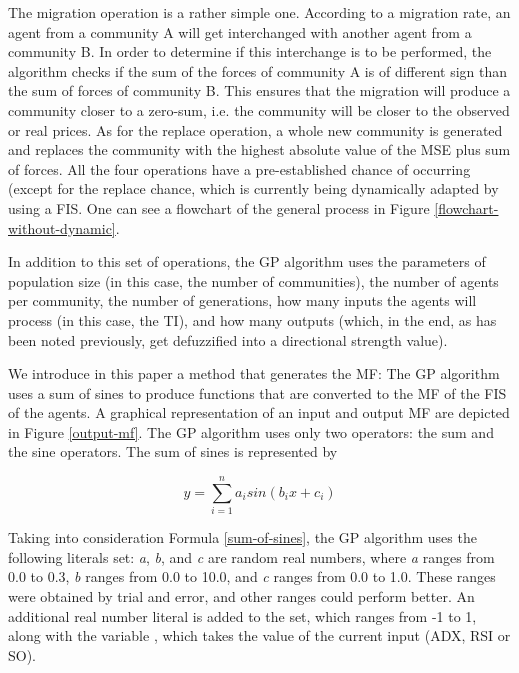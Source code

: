 \documentclass[a4paper,twoside]{article}
\begin{document}
The migration operation is a rather simple one. According to a
migration rate, an agent from a community A will get interchanged
with another agent from a community B. In order to determine if this
interchange is to be performed, the algorithm checks if the sum of the
forces of community A is of different sign than the sum of forces of
community B. This ensures that the migration will produce a community
closer to a zero-sum, i.e. the community will be closer to the
observed or real prices. As for the replace operation, a whole new
community is generated and replaces the community with the highest
absolute value of the MSE plus sum of forces. All the four operations
have a pre-established chance of occurring (except for the replace
chance, which is currently being dynamically adapted by using a FIS.
One can see a flowchart of the general process in Figure
\ref{flowchart-without-dynamic}. %

In addition to this set of operations, the GP algorithm uses the
parameters of population size (in this case, the number of
communities), the number of agents per community, the number of
generations, how many inputs the agents will process (in this case,
the TI), and how many outputs (which, in the end, as has been noted
previously, get defuzzified into a directional strength value). %

We introduce in this paper a method  that generates the MF: The GP algorithm uses a sum of
sines to produce functions that are converted to the MF of the FIS of
the agents. A graphical representation of an input and output MF 
are depicted in Figure \ref{output-mf}. The GP algorithm uses only two operators: the sum and
the sine operators. The sum of sines is represented by

\begin{equation} \label{sum-of-sines}
  y = \sum_{i=1}^{n} a_{i} sin(b_{i}x + c_{i})
\end{equation}

Taking into consideration Formula \ref{sum-of-sines}, the GP algorithm
uses the following literals set: \textit{a}, \textit{b}, and
\textit{c} are random real numbers, where \textit{a} ranges from 0.0
to 0.3, \textit{b} ranges from 0.0 to 10.0, and \textit{c} ranges from
0.0 to 1.0. These ranges were obtained by trial and error, and other
ranges could perform better. An additional real number literal is
added to the set, which ranges from -1 to 1, along with the variable
, which takes the value of the current input (ADX, RSI or
SO). 
\end{document}
